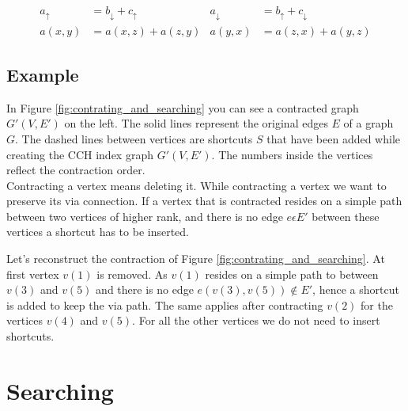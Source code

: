 \begin{align*}\label{eq:lower_triangle}
    a_\uparrow & = b_\downarrow + c_\uparrow    &  a_\downarrow & = b_\uparrow + c_\downarrow \\
    a(x, y) & = a(x, z) + a(z, y) & a(y, x) & = a(z, x) + a(y, z)
\end{align*}

\subsection{Example}

In Figure \ref{fig:contrating_and_searching} you can see a contracted graph $G'(V,E')$ on the left.
The solid lines represent the original edges $E$ of a graph $G$.
The dashed lines between vertices are shortcuts $S$ that have been added while creating the CCH index graph $G'(V, E')$.
The numbers inside the vertices reflect the contraction order.
\\
Contracting a vertex means deleting it.
While contracting a vertex we want to preserve its via connection.
If a vertex that is contracted resides on a simple path between two vertices of higher rank, and there is no edge $e \epsilon E'$ between these vertices a shortcut has to be inserted.

Let's reconstruct the contraction of Figure \ref{fig:contrating_and_searching}.
At first vertex $v(1)$ is removed.
As $v(1)$ resides on a simple path to between $v(3)$ and $v(5)$ and there is no edge $e(v(3), v(5)) \notin E'$, hence a shortcut is added to keep the via path.
The same applies after contracting $v(2)$ for the vertices $v(4)$ and $v(5)$.
For all the other vertices we do not need to insert shortcuts.

\section{Searching}



